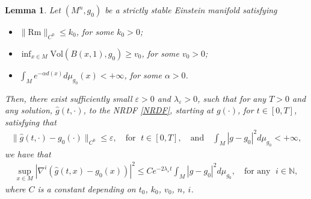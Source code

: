 \documentclass[12pt]{amsart}
\newtheorem{lemma}{Lemma}[section]
\begin{document}
\begin{lemma}\label{local L^2 to C^0 estimate}
    Let $(M^n, g_0)$ be a strictly stable Einstein manifold satisfying 
    \begin{itemize}
        \item $\|\mathrm{Rm}\|_{C^{0}} \leq k_0$, for some $k_0 > 0$;
        \item $\displaystyle \inf_{x\in M} \mathrm{Vol}(B(x, 1), g_0) \geq v_0$, for some $v_0 > 0$;
        \item $\displaystyle \int_{M} e^{-\alpha d(x)} d\mu_{g_0}(x) < +\infty$, for some $\alpha > 0$.
    \end{itemize}
    Then, there exist sufficiently small $\varepsilon > 0$ and $\lambda_{\varepsilon} > 0$, such that for any $T > 0$ and any solution, $\hat{g}(t, \cdot)$, to the NRDF \eqref{NRDF}, starting at $g(\cdot)$, for $t\in [0, T]$, satisfying that 
    \begin{align*}
        \|\hat{g}(t, \cdot) - g_0(\cdot)\|_{C^{0}} \leq \varepsilon, \quad \text{for }\; t\in[0, T], \quad  \text{and} \quad \int_{M}|g - g_0|^{2} d\mu_{g_0} < +\infty, 
    \end{align*}
    we have that  
    \begin{align}
        \sup_{ x\in  M} |\nabla^{i} (\hat{g}(t, x) - g_0(x))|^2 \leq C e^{-2\lambda_{\varepsilon}t} \int_{M}|g - g_0|^2 d\mu_{g_0}, \quad \text{for any }\;  i \in \mathbb{N},
    \end{align}
    where $C$ is a constant depending on $t_0$, $k_0$, $v_0$, $n$, $i$. 
\end{lemma}
\end{document}
